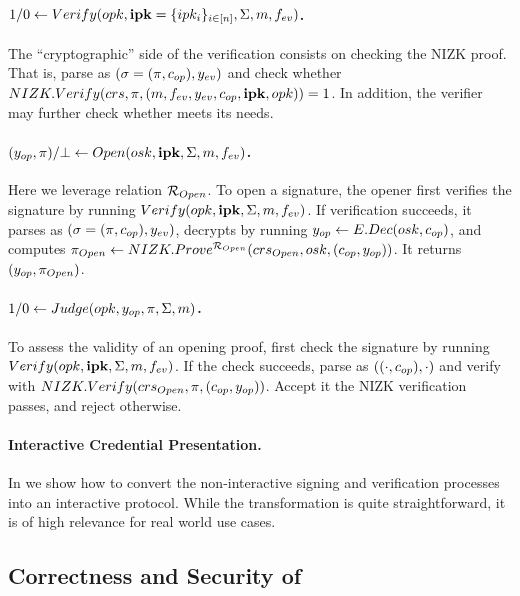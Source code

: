 \paragraph{$1/0 \gets Verify(opk,\mathbf{ipk}=\lbrace ipk_i\rbrace_{i\in[n]},
  \Sigma,m,f_{ev})$.} %
The ``cryptographic'' side of the verification consists on checking
the NIZK proof. That is, parse \Sig as $(\sigma = (\pi,c_{op}),y_{ev})$ and
check whether $NIZK.Verify(crs,\pi,(m,f_{ev},y_{ev},
c_{op},\mathbf{ipk},opk)) = 1$. In addition, the verifier may further check
whether \yeval meets its needs.

\paragraph{$(y_{op},\pi)/\bot \gets
  Open(osk,\mathbf{ipk},\Sigma,m,f_{ev})$.} %
Here we leverage relation $\mathcal{R}_{Open}$.
%
To open a signature, the opener first verifies the signature by running $Verify
(opk,\mathbf{ipk}, \Sigma,m,f_{ev})$. If verification succeeds, it parses
\Sig as $(\sigma=(\pi,c_{op}),y_{ev})$, decrypts \Ec by running $y_{op}
\gets E.Dec(osk,c_{op})$, and computes $\pi_{Open} \gets
NIZK.Prove^{\mathcal{R}_{Open}}(crs_{Open},osk,(c_{op},y_{op}))$. It
returns $(y_{op},\pi_{Open})$.

\paragraph{$1/0 \gets Judge(opk,y_{op},\pi,\Sigma,m)$.} %
To assess the validity of an opening proof, first check the signature
by running $Verify(opk,\mathbf{ipk},\Sigma,m,f_{ev})$. If the check succeeds,
parse \Sig as $((\cdot,c_{op}),\cdot)$ and verify \NIZKproof with
$NIZK.Verify(crs_{Open},\pi,(c_{op},y_{op}))$. Accept it the NIZK
verification passes, and reject otherwise.

\paragraph{Interactive Credential Presentation.} In 
we show how to convert the non-interactive signing and verification processes
into an interactive protocol. While the transformation is quite straightforward,
it is of high relevance for real world use cases.

\subsection{Correctness and Security of \CUASGen}
\label{ssec:security-uas}

